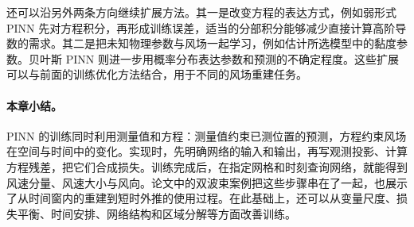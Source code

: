 还可以沿另外两条方向继续扩展方法。其一是改变方程的表达方式，例如弱形式 PINN 先对方程积分，再形成训练误差，适当的分部积分能够减少直接计算高阶导数的需求\cite{kharazmi2021hpvpinn}。其二是把未知物理参数与风场一起学习，例如估计所选模型中的黏度参数。贝叶斯 PINN 则进一步用概率分布表达参数和预测的不确定程度\cite{yang2021bpinn}。这些扩展可以与前面的训练优化方法结合，用于不同的风场重建任务。

\FloatBarrier

\paragraph{本章小结。}
PINN 的训练同时利用测量值和方程：测量值约束已测位置的预测，方程约束风场在空间与时间中的变化。实现时，先明确网络的输入和输出，再写观测投影、计算方程残差，把它们合成损失。训练完成后，在指定网格和时刻查询网络，就能得到风速分量、风速大小与风向。论文中的双波束案例把这些步骤串在了一起，也展示了从时间窗内的重建到短时外推的使用过程。在此基础上，还可以从变量尺度、损失平衡、时间安排、网络结构和区域分解等方面改善训练。
